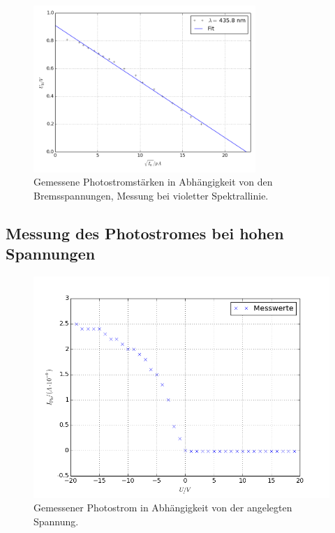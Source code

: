 \begin{figure}[pt]
	\centering
	\includegraphics[width=0.75\textwidth]{Bilder/Fit_violett.png}
	\caption{Gemessene Photostromstärken in Abhängigkeit von den Bremsspannungen, Messung bei violetter Spektrallinie.}
	\label{fig:uidiagramm2}
\end{figure}


\subsection{Messung des Photostromes bei hohen Spannungen}
\label{sec:Auswertung2}
\begin{figure}[h]
	\centering
	\includegraphics[width=\textwidth]{Bilder/messung2.png}
	\caption{Gemessener Photostrom in Abhängigkeit von der angelegten Spannung.}
	\label{fig:uidiagramm3}
\end{figure}

